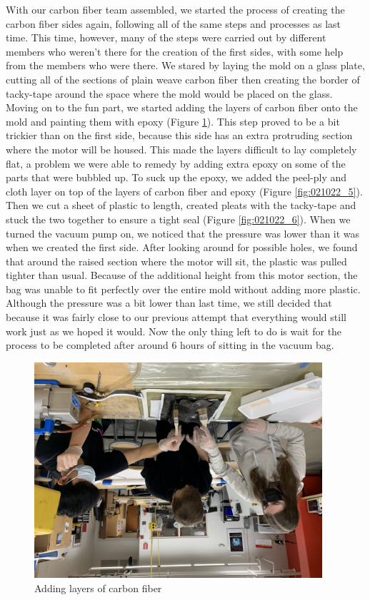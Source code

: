 With our carbon fiber team assembled, we started the process of creating the carbon fiber sides again, following all of the same steps and processes as last time. This time, however, many of the steps were carried out by different members who weren't there for the creation of the first sides, with some help from the members who were there. We stared by laying the mold on a glass plate, cutting all of the sections of plain weave carbon fiber then creating the border of tacky-tape around the space where the mold would be placed on the glass. Moving on to the fun part, we started adding the layers of carbon fiber onto the mold and painting them with epoxy (Figure \ref{fig:021022_4}). This step proved to be a bit trickier than on the first side, because this side has an extra protruding section where the motor will be housed. This made the layers difficult to lay completely flat, a problem we were able to remedy by adding extra epoxy on some of the parts that were bubbled up. To suck up the epoxy, we added the peel-ply and cloth layer on top of the layers of carbon fiber and epoxy (Figure \ref{fig:021022_5}). Then we cut a sheet of plastic to length, created pleats with the tacky-tape and stuck the two together to ensure a tight seal (Figure \ref{fig:021022_6}). When we turned the vacuum pump on, we noticed that the pressure was lower than it was when we created the first side. After looking around for possible holes, we found that around the raised section where the motor will sit, the plastic was pulled tighter than usual. Because of the additional height from this motor section, the bag was unable to fit perfectly over the entire mold without adding more plastic. Although the pressure was a bit lower than last time, we still decided that because it was fairly close to our previous attempt that everything would still work just as we hoped it would. Now the only thing left to do is wait for the process to be completed after around 6 hours of sitting in the vacuum bag.


\begin{figure}[htp]
\centering
\includegraphics[width=0.95\textwidth, angle=0]{Meetings/February/02-10-22/2-10-22_Hardware_Figure1 - Nathan Forrer.JPG}
\caption{Adding layers of carbon fiber}
\label{fig:021022_4}
\end{figure}

